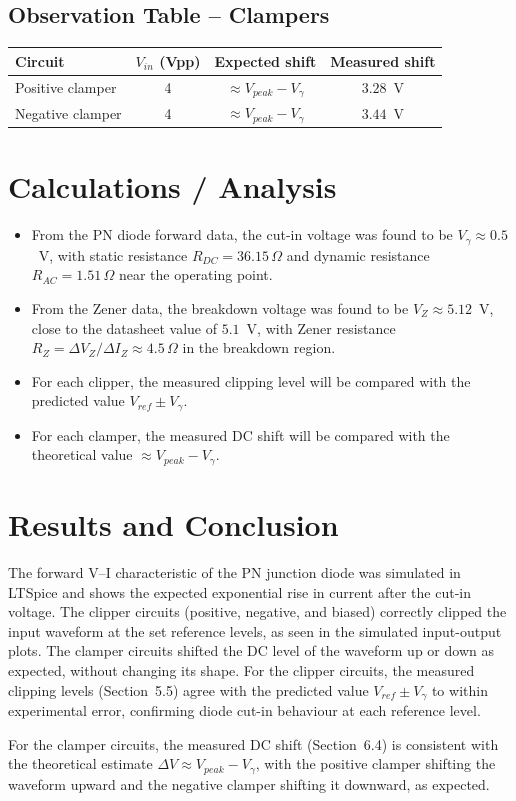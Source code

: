 \documentclass[12pt,a4paper]{article}
\begin{document}
\subsection{Observation Table -- Clampers}
\begin{center}
\begin{tabular}{lccc}
\toprule
Circuit & $V_{in}$ (Vpp) & Expected shift & Measured shift \\
\midrule
Positive clamper & 4 & $\approx V_{peak} - V_\gamma$ & $3.28$~V \\
Negative clamper & 4 & $\approx V_{peak} - V_\gamma$ & $3.44$~V \\
\bottomrule
\end{tabular}
\end{center}


\section{Calculations / Analysis}
\begin{itemize}
    \item From the PN diode forward data, the cut-in voltage was found to be
$V_\gamma \approx 0.5$~V, with static resistance $R_{DC} = 36.15\,\Omega$ and dynamic
resistance $R_{AC} = 1.51\,\Omega$ near the operating point.

    \item From the Zener data, the breakdown voltage was found to be $V_Z \approx 5.12$~V,
close to the datasheet value of $5.1$~V, with Zener resistance
$R_Z = \Delta V_Z/\Delta I_Z \approx 4.5\,\Omega$ in the breakdown region.
    \item For each clipper, the measured clipping level will be compared with the predicted value $V_{ref} \pm V_\gamma$.
    \item For each clamper, the measured DC shift will be compared with the theoretical value $\approx V_{peak} - V_\gamma$.
\end{itemize}

\section{Results and Conclusion}
The forward V--I characteristic of the PN junction diode was simulated in LTSpice and shows the expected exponential rise in current after the cut-in voltage. The clipper circuits (positive, negative, and biased) correctly clipped the input waveform at the set reference levels, as seen in the simulated input-output plots. The clamper circuits shifted the DC level of the waveform up or down as expected, without changing its shape. 
For the clipper circuits, the measured clipping levels (Section~5.5) agree with the
predicted value $V_{ref} \pm V_\gamma$ to within experimental error, confirming diode
cut-in behaviour at each reference level.

For the clamper circuits, the measured DC shift (Section~6.4) is consistent with the
theoretical estimate $\Delta V \approx V_{peak} - V_\gamma$, with the positive clamper
shifting the waveform upward and the negative clamper shifting it downward, as expected.
\end{document}
